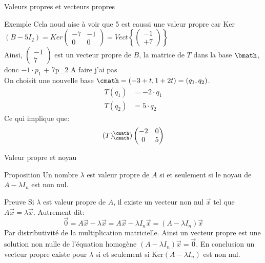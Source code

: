 \begin{parag}{Valeurs propres et vecteurs propres}
\begin{subparag}{Exemple}
        Cela noud aise à voir que 5 est eaussi une valeur propre car Ker$(B - 5I_2) = Ker \begin{pmatrix}
            -7 & -1 \\ 0 & 0
        \end{pmatrix} = Vect\left\{\begin{pmatrix}
            -1 \\ +7
        \end{pmatrix}\right\}$\\
        Ainsi, $\begin{pmatrix}
            -1 \\ 7
        \end{pmatrix}$ est un vecteur propre de $B$, la matrice de $T$ dans la base $\bmath$, donc $-1\cdot p_1$ + 7\cdot p_2 A faire j'ai pas\\
        On choisit une nouvelle base $\cmath = (-3 + t, 1 + 2t) = (q_1, q_2)$.\\
        \begin{align*}
            T(q_1) &= -2\cdot q_1\\
            T(q_2) &= 5\cdot q_2
        \end{align*}
        Ce qui implique que:
        \[(T)_\cmath^\cmath ) \begin{pmatrix}
            -2 & 0 \\ 0 & 5
        \end{pmatrix}\]
    \end{subparag}
    \end{parag}     

    \begin{parag}{Valeur propre et noyau}
        \begin{subparag}{Proposition}
            Un nombre $\lambda$ est valeur propre de $A$ si et seulement si le noyau de $A - \lambda I_n$ est non nul.
        \end{subparag}
        
        \begin{subparag}{Preuve}
            Si $\lambda$ est valeur propre de $A$, il existe un vecteur non nul $\vec{x}$ tel que $A\vec{x} = \lambda \vec{x}$. Autrement dit:
            \[\vec{0} = A\vec{x} - \lambda \vec{x} =  A\vec{x} - \lambda I_n\vec{x} = (A - \lambda I_n)\vec{x}\]
            Par distributivité de la multiplication matricielle. Ainsi un vecteur propre est une solution non nulle de l'équation homogène $(A - \lambda I_n)\vec{x} = \vec{0}$. En conclusion un vecteur propre existe pour $\lambda$ si et seulement si Ker$(A - \lambda I_n)$ est non nul.
        \end{subparag}
    \end{parag}

    








